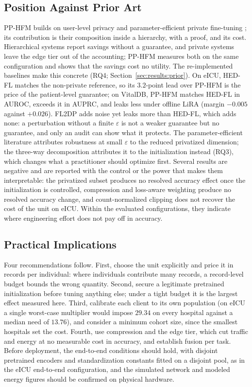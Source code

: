\subsection{Position Against Prior Art}
PP-HFM builds on user-level privacy \cite{ref11}
and parameter-efficient private fine-tuning \cite{ref12, ref13}; its
contribution is their composition inside a hierarchy, with a proof, and its
cost. Hierarchical systems
\cite{ref3, ref4, ref5} report savings without a guarantee, and private
systems \cite{ref9, ref10} leave the edge tier out of the accounting; PP-HFM
measures both on the same configuration and shows that the savings cost no
utility. The re-implemented baselines make this concrete
(RQ4; Section~\ref{sec:results:prior}). On eICU, HED-FL matches the non-private
reference, so its $3.2$-point lead over PP-HFM is the price of the
patient-level guarantee; on VitalDB, PP-HFM matches HED-FL in AUROC, exceeds
it in AUPRC, and leaks less under offline LiRA (margin $-0.005$ against $+0.026$). FL2DP adds noise yet leaks more than HED-FL, which adds none:
a perturbation without a finite $\varepsilon$ is not a weaker guarantee but
no guarantee, and only an audit can show what it protects. The parameter-efficient literature attributes
robustness at small $\varepsilon$ to the reduced privatized dimension; the
three-way decomposition attributes it to the initialization instead (RQ3), which
changes what a practitioner should optimize first. Several results are
negative and are reported with the control or the power that makes them
interpretable: the privatized subset produces no resolved accuracy effect once the
initialization is controlled, compression and loss-aware weighting produce no
resolved accuracy change, and count-normalized clipping does not recover the
cost of the unit on eICU. Within the evaluated configurations, they indicate
where engineering effort does not pay off in accuracy.

\subsection{Practical Implications}
Four recommendations follow. First, choose the unit explicitly and price it
in records per individual: where individuals contribute many records, a
record-level budget bounds the wrong quantity. Second, secure a legitimate
pretrained initialization before tuning anything else; under a tight budget
it is the largest effect measured here. Third, calibrate each client to its
own population (on eICU a single worst-case multiplier would impose $29.34$
on every hospital against a median need of $13.76$), and consider a minimum
cohort size, since the smallest hospitals set the cost. Fourth, use
compression and the edge tier, which cut traffic and energy at no measurable
cost in accuracy, and establish fusion per task. Before deployment, the
end-to-end conditions should hold, with disjoint pretrained encoders and
standardization constants fitted on a disjoint pool, as in the eICU end-to-end
configuration, and the simulated network and modeled energy figures should be
confirmed on physical hardware.

